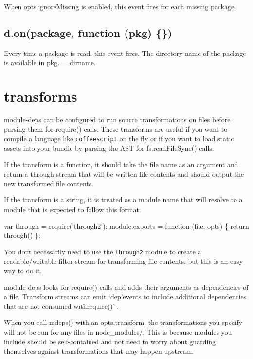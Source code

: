When {\ttfamily opts.\+ignore\+Missing} is enabled, this event fires for each missing package.

\subsection*{d.\+on(\textquotesingle{}package\textquotesingle{}, function (pkg) \{\})}

Every time a package is read, this event fires. The directory name of the package is available in {\ttfamily pkg.\+\_\+\+\_\+dirname}.

\section*{transforms}

module-\/deps can be configured to run source transformations on files before parsing them for {\ttfamily require()} calls. These transforms are useful if you want to compile a language like \href{http://coffeescript.org/}{\tt coffeescript} on the fly or if you want to load static assets into your bundle by parsing the A\+ST for {\ttfamily fs.\+read\+File\+Sync()} calls.

If the transform is a function, it should take the {\ttfamily file} name as an argument and return a through stream that will be written file contents and should output the new transformed file contents.

If the transform is a string, it is treated as a module name that will resolve to a module that is expected to follow this format\+:


\begin{DoxyCode}
var through = require('through2');
module.exports = function (file, opts) \{ return through() \};
\end{DoxyCode}


You don\textquotesingle{}t necessarily need to use the \href{https://github.com/rvagg/through2}{\tt through2} module to create a readable/writable filter stream for transforming file contents, but this is an easy way to do it.

module-\/deps looks for {\ttfamily require()} calls and adds their arguments as dependencies of a file. Transform streams can emit `\textquotesingle{}dep'{\ttfamily events to include additional dependencies that are not consumed with}require()\`{}.

When you call {\ttfamily mdeps()} with an {\ttfamily opts.\+transform}, the transformations you specify will not be run for any files in node\+\_\+modules/. This is because modules you include should be self-\/contained and not need to worry about guarding themselves against transformations that may happen upstream.

